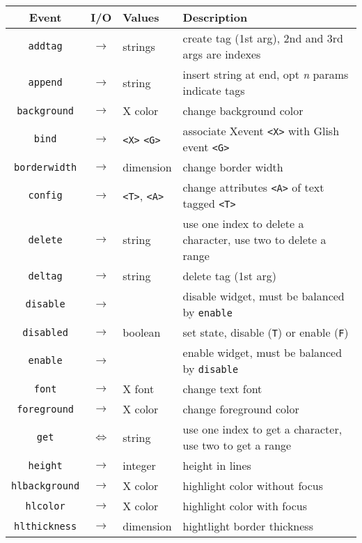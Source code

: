 \begin{table}[tbh]
{\small
\begin{center}
\begin{tabular}{|c|c|p{0.6in}|p{3.3in}|}
\hline
Event & I/O & Values & Description \\
\hline
\hline
{\tt addtag}	&$\rightarrow$&strings& create tag (1st arg), 2nd and 3rd args are indexes \\ \hline
{\tt append}	&$\rightarrow$&string& insert string at end, opt {\em n} params indicate tags \\ \hline
{\tt background}&$\rightarrow$& X color & change background color \\ \hline
{\tt bind}	&$\rightarrow$&\verb+<X>+ \verb+<G>+& associate Xevent \verb+<X>+ with Glish event \verb+<G>+ \\ \hline
{\tt borderwidth}&$\rightarrow$& dimension & change border width \\ \hline
{\tt config}	&$\rightarrow$&\verb+<T>+, \verb+<A>+& change attributes \verb+<A>+ of text tagged \verb+<T>+ \\ \hline
{\tt delete}	&$\rightarrow$&string& use one index to delete a character, use two to delete a range \\ \hline
{\tt deltag}	&$\rightarrow$&string& delete tag (1st arg) \\ \hline
{\tt disable}&$\rightarrow$& & disable widget, must be balanced by {\tt enable} \\ \hline
{\tt disabled}	&$\rightarrow$& boolean & set state, disable ({\tt T}) or enable ({\tt F}) \\ \hline
{\tt enable}&$\rightarrow$& & enable widget, must be balanced by {\tt disable} \\ \hline
{\tt font}	&$\rightarrow$& X font & change text font \\ \hline
{\tt foreground}&$\rightarrow$& X color & change foreground color \\ \hline
{\tt get}	&$\Leftrightarrow$&string& use one index to get a character, use two to get a range \\ \hline
{\tt height}	&$\rightarrow$&integer& height in lines \\ \hline
{\tt hlbackground}&$\rightarrow$& X color & highlight color without focus \\ \hline
{\tt hlcolor}	&$\rightarrow$& X color & highlight color with focus \\ \hline
{\tt hlthickness}&$\rightarrow$& dimension & hightlight border thickness \\ \hline

\end{tabular}
\end{center}}
\end{table}
